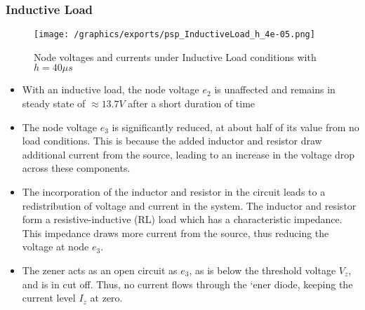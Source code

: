 \subsubsection{Inductive Load}
\begin{figure}[H]
    \centering
    \texttt{[image: /graphics/exports/psp\_InductiveLoad\_h\_4e-05.png]}
    \caption{Node voltages and currents under Inductive Load conditions with $h=40\mu s$}
\end{figure}
\begin{itemize}
	\item With an inductive load, the node voltage $e_2$ is unaffected and remains in steady state of $\approx 13.7V$ after a short duration of time
	\item The node voltage $e_3$ is significantly reduced, at about half of its value from no load conditions. This is because the added inductor and resistor draw additional current from the source, leading to an increase in the voltage drop across these components.
	\item The incorporation of the inductor and resistor in the circuit leads to a redistribution of voltage and current in the system. The inductor and resistor form a resistive-inductive (RL) load which has a characteristic impedance. This impedance draws more current from the source, thus reducing the voltage at node $e_3$.
	\item The zener acts as an open circuit as $e_3$, as is below the threshold voltage $V_z$, and is in cut off. Thus, no current flows through the `ener diode, keeping the current level $I_z$ at zero.
\end{itemize}

